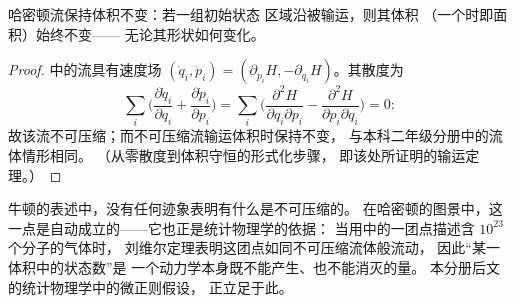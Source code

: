 \begin{theorem}[刘维尔定理]\label{thm:b3:hamiltonian-mechanics:liouville}
哈密顿流保持体积不变：若一组初始状态
区域沿被输运，则其体积
（一个时即面积）始终不变——
无论其形状如何变化。
\end{theorem}

\begin{proof}
中的流具有速度场 $(\dot q_i, \dot p_i) =
(\partial_{p_i}H, -\partial_{q_i}H)$。其散度为
\[
\sum_i\Big(\frac{\partial\dot q_i}{\partial q_i}
 + \frac{\partial\dot p_i}{\partial p_i}\Big)
 = \sum_i\Big(\frac{\partial^2H}{\partial q_i\partial p_i}
 - \frac{\partial^2H}{\partial p_i\partial q_i}\Big) = 0 :
\]
故该流不可压缩；而不可压缩流输运体积时保持不变，
与本科二年级分册中的流体情形相同。
（从零散度到体积守恒的形式化步骤，
即该处所证明的输运定理。）
\end{proof}

\begin{remark}[刘维尔定理的意义]\label{rem:b3:hamiltonian-mechanics:liouville-matters}
牛顿的表述中，没有任何迹象表明有什么是不可压缩的。
在哈密顿的图景中，这一点是自动成立的——它也正是统计物理学的依据：
当用中的一团点描述含 $10^{23}$ 个分子的气体时，
刘维尔定理表明这团点如同不可压缩流体般流动，
因此“某一体积中的状态数”是
一个动力学本身既不能产生、也不能消灭的量。
本分册后文的统计物理学中的微正则假设，
正立足于此。
\end{remark}

